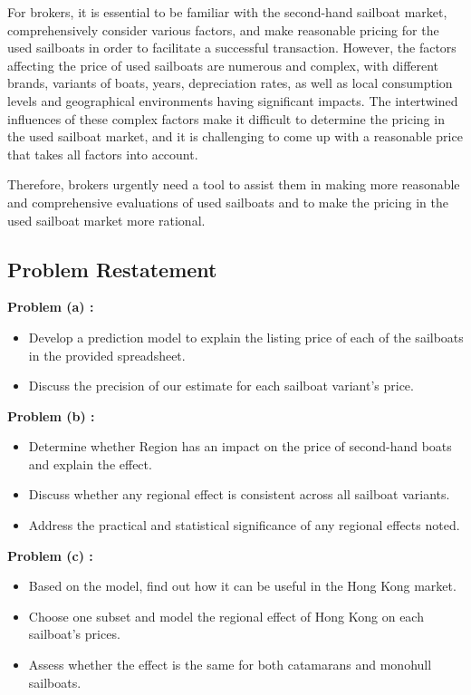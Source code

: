 \documentclass[12pt]{article}  %
\begin{document}
For brokers, it is essential to be familiar with the second-hand sailboat market, comprehensively consider various factors, and make reasonable pricing for the used sailboats in order to facilitate a successful transaction. However, the factors affecting the price of used sailboats are numerous and complex, with different brands, variants of boats, years, depreciation rates, as well as local consumption levels and geographical environments having significant impacts. The intertwined influences of these complex factors make it difficult to determine the pricing in the used sailboat market, and it is challenging to come up with a reasonable price that takes all factors into account.

Therefore, brokers urgently need a tool to assist them in making more reasonable and comprehensive evaluations of used sailboats and to make the pricing in the used sailboat market more rational.
\subsection{Problem Restatement}
\textbf{Problem (a) :}
\begin{itemize}
    \item Develop a prediction model to explain the listing price of each of the sailboats in the provided spreadsheet.
    \item Discuss the precision of our estimate for each sailboat variant's price.
\end{itemize}

\textbf{Problem (b) :}
\begin{itemize}
    \item Determine whether Region has an impact on the price of second-hand boats and explain the effect.
    \item Discuss whether any regional effect is consistent across all sailboat variants.
    \item Address the practical and statistical significance of any regional effects noted.
\end{itemize}

\textbf{Problem (c) :}
\begin{itemize}
    \item Based on the model, find out how it can be useful in the Hong Kong market.
    \item Choose one subset and model the regional effect of Hong Kong on each sailboat's prices.
    \item Assess whether the effect is the same for both catamarans and monohull sailboats.
\end{itemize}
\end{document}
